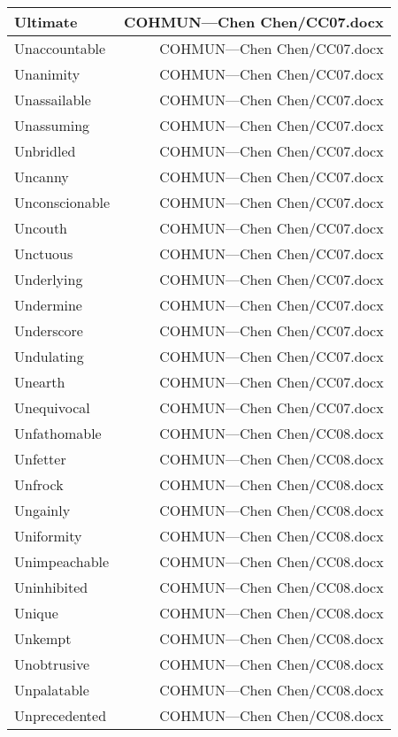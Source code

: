 \documentclass{article}
\begin{document}
\begin{center}
\begin{longtable}{|l|r|}
\hline
Ultimate  &  COHMUN---Chen Chen/CC07.docx\\  
\hline
Unaccountable  &  COHMUN---Chen Chen/CC07.docx\\  
\hline
Unanimity  &  COHMUN---Chen Chen/CC07.docx\\  
\hline
Unassailable  &  COHMUN---Chen Chen/CC07.docx\\  
\hline
Unassuming  &  COHMUN---Chen Chen/CC07.docx\\  
\hline
Unbridled  &  COHMUN---Chen Chen/CC07.docx\\  
\hline
Uncanny  &  COHMUN---Chen Chen/CC07.docx\\  
\hline
Unconscionable  &  COHMUN---Chen Chen/CC07.docx\\  
\hline
Uncouth  &  COHMUN---Chen Chen/CC07.docx\\  
\hline
Unctuous  &  COHMUN---Chen Chen/CC07.docx\\  
\hline
Underlying  &  COHMUN---Chen Chen/CC07.docx\\  
\hline
Undermine  &  COHMUN---Chen Chen/CC07.docx\\  
\hline
Underscore  &  COHMUN---Chen Chen/CC07.docx\\  
\hline
Undulating  &  COHMUN---Chen Chen/CC07.docx\\  
\hline
Unearth  &  COHMUN---Chen Chen/CC07.docx\\  
\hline
Unequivocal  &  COHMUN---Chen Chen/CC07.docx\\  
\hline
Unfathomable  &  COHMUN---Chen Chen/CC08.docx\\  
\hline
Unfetter  &  COHMUN---Chen Chen/CC08.docx\\  
\hline
Unfrock  &  COHMUN---Chen Chen/CC08.docx\\  
\hline
Ungainly  &  COHMUN---Chen Chen/CC08.docx\\  
\hline
Uniformity  &  COHMUN---Chen Chen/CC08.docx\\  
\hline
Unimpeachable  &  COHMUN---Chen Chen/CC08.docx\\  
\hline
Uninhibited  &  COHMUN---Chen Chen/CC08.docx\\  
\hline
Unique  &  COHMUN---Chen Chen/CC08.docx\\  
\hline
Unkempt  &  COHMUN---Chen Chen/CC08.docx\\  
\hline
Unobtrusive  &  COHMUN---Chen Chen/CC08.docx\\  
\hline
Unpalatable  &  COHMUN---Chen Chen/CC08.docx\\  
\hline
Unprecedented  &  COHMUN---Chen Chen/CC08.docx\\  

\end{longtable}
\end{center}
\end{document}
